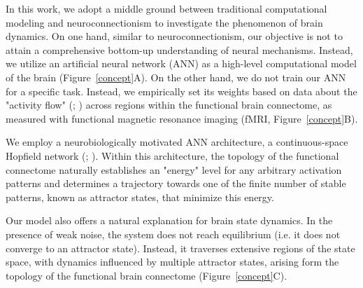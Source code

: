 \documentclass{article}
\begin{document}
In this work, we adopt a middle ground between traditional computational modeling and neuroconnectionism to investigate the phenomenon of brain dynamics.
On one hand, similar to neuroconnectionism, our objective is not to attain a comprehensive bottom-up understanding of neural mechanisms. Instead, we utilize an artificial neural network (ANN) as a high-level computational model of the brain (Figure~\ref{concept}A).
On the other hand, we do not train our ANN for a specific task. Instead, we empirically set its weights based on  data about the "activity flow" (\cite{Cole_2016}; \cite{Ito_2017}) across regions within the functional brain connectome, as measured with functional magnetic resonance imaging (fMRI, Figure~\ref{concept}B).

We employ a neurobiologically motivated ANN architecture, a continuous-space Hopfield network (\cite{Hopfield_1982}; \cite{Krotov_2023}).
Within this architecture, the topology of the functional connectome naturally establishes an "energy" level for any arbitrary activation patterns and determines a trajectory towards one of the finite number of stable patterns, known as attractor states, that minimize this energy.

Our model also offers a natural explanation for brain state dynamics.
In the presence of weak noise, the system does not reach equilibrium (i.e. it does not converge to an attractor state). Instead, it traverses extensive regions of the state space, with dynamics influenced by multiple attractor states, arising form the topology of the functional brain connectome (Figure~\ref{concept}C).
\end{document}
